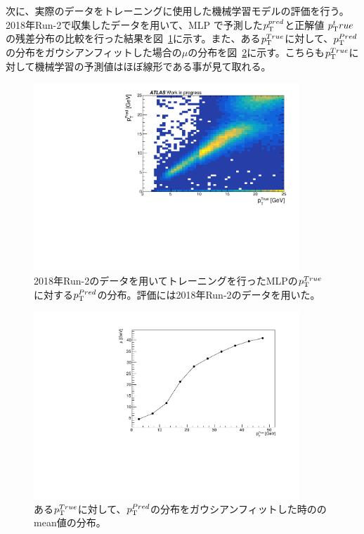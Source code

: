 次に、実際のデータをトレーニングに使用した機械学習モデルの評価を行う。
2018年Run-2で収集したデータを用いて、MLP で予測した$p_{\rm{T}}^{pred}$と正解値 $p_{\rm{T}}^true$の残差分布の比較を行った結果を図~\ref{fig:zannsa_25_Data}に示す。また、ある$p_{\rm{T}}^{True}$に対して、$p_{\rm{T}}^{Pred}$の分布をガウシアンフィットした場合の$\mu$の分布を図~\ref{fig:Gausmu_Data}に示す。こちらも$p_{\rm{T}}^{True}$に対して機械学習の予測値はほぼ線形である事が見て取れる。

\begin{figure}[htb]
  \centering
  \includegraphics[clip, width=10cm]{fig/4/pred_true_25.pdf}
  \caption{2018年Run-2のデータを用いてトレーニングを行ったMLPの$p_{\rm{T}}^{True}$に対する$p_{\rm{T}}^{Pred}$の分布。評価には2018年Run-2のデータを用いた。}
  \label{fig:zannsa_25_Data}
\end{figure}

\begin{figure}[htb]
  \centering
  \includegraphics[clip, width=10cm]{fig/4/tp_Gausmean_Data.pdf}
  \caption{ある$p_{\rm{T}}^{True}$に対して、$p_{\rm{T}}^{Pred}$の分布をガウシアンフィットした時ののmean値の分布。}
  \label{fig:Gausmu_Data}
\end{figure}

